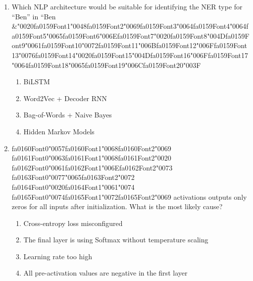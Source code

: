 \documentclass[12pt]{article}
\begin{document}
\begin{enumerate}[label=Q\arabic*.]
 \item Which NLP architecture would be suitable for identifying the NER type for ``Ben'' in ``Ben \&{\char"0020}{\csname fa0159Font1\endcsname\char"0048}{\csname fa0159Font2\endcsname\char"0069}{\csname fa0159Font3\endcsname\char"0064}{\csname fa0159Font4\endcsname\char"0064}{\csname fa0159Font5\endcsname\char"0065}{\csname fa0159Font6\endcsname\char"006E}{\csname fa0159Font7\endcsname\char"0020}{\csname fa0159Font8\endcsname\char"004D}{\csname fa0159Font9\endcsname\char"0061}{\csname fa0159Font10\endcsname\char"0072}{\csname fa0159Font11\endcsname\char"006B}{\csname fa0159Font12\endcsname\char"006F}{\csname fa0159Font13\endcsname\char"0076}{\csname fa0159Font14\endcsname\char"0020}{\csname fa0159Font15\endcsname\char"004D}{\csname fa0159Font16\endcsname\char"006F}{\csname fa0159Font17\endcsname\char"0064}{\csname fa0159Font18\endcsname\char"0065}{\csname fa0159Font19\endcsname\char"006C}{\csname fa0159Font20\endcsname\char"003F}
 \begin{enumerate}[label=(\Alph*)]
     \item BiLSTM
     \item Word2Vec + Decoder RNN
     \item Bag-of-Words + Naive Bayes
     \item Hidden Markov Models
 \end{enumerate}
 
 \item {\csname fa0160Font0\endcsname\char"0057}{\csname fa0160Font1\endcsname\char"0068}{\csname fa0160Font2\endcsname\char"0069} {\csname fa0161Font0\endcsname\char"0063}{\csname fa0161Font1\endcsname\char"0068}{\csname fa0161Font2\endcsname\char"0020} {\csname fa0162Font0\endcsname\char"0061}{\csname fa0162Font1\endcsname\char"006E}{\csname fa0162Font2\endcsname\char"0073} {\csname fa0163Font0\endcsname\char"0077}{\char"0065}{\csname fa0163Font2\endcsname\char"0072} {\csname fa0164Font0\endcsname\char"0020}{\csname fa0164Font1\endcsname\char"0061}{\char"0074} {\csname fa0165Font0\endcsname\char"0074}{\csname fa0165Font1\endcsname\char"0072}{\csname fa0165Font2\endcsname\char"0069} activations outputs only zeros for all inputs after initialization. What is the most likely cause?
 \begin{enumerate}[label=(\Alph*)]
     \item Cross-entropy loss misconfigured
     \item The final layer is using Softmax without temperature scaling
     \item Learning rate too high
     \item All pre-activation values are negative in the first layer
 \end{enumerate}
 

\end{enumerate}
\end{document}
